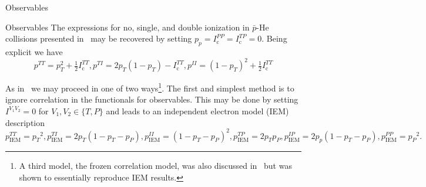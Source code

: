 \documentclass[letterpaper, 11 pt]{report}
\begin{document}
\begin{chapter}{Observables \label{chap:p-he2p-he}}
\begin{section}{Observables \label{sec:phe2p-obs}}
      The expressions for no, single, and double ionization in $\bar{p}$-He collisions presented
      in~\cite{pbarhe} may be recovered by setting $p_p = I^{PP}_\mathrm{c} = I^{TP}_\mathrm{c} = 0$.
      Being explicit we have
      \begin{subequations} \label{eq:prob-pbarhe}
         \begin{equation} \label{eq:ptt-pbarhe}
            p^{TT} = p_T^2 + \tfrac{1}{2} I^{TT}_\mathrm{c},
         \end{equation}
         \begin{equation} \label{eq:pti-pbarhe}
            p^{TI} = 2p_T(1 - p_T) - I^{TT}_\mathrm{c},
         \end{equation}
         \begin{equation} \label{eq:pii-pbarhe}
            p^{II} = (1 - p_T)^2 + \tfrac{1}{2} I^{TT}_\mathrm{c}
         \end{equation}
      \end{subequations}

      As in~\cite{pbarhe} we may proceed in one of two ways\footnote{A third model, the frozen
      correlation model, was also discussed in~\cite{pbarhe} but was shown to essentially reproduce IEM
      results.}. The first and simplest method is to ignore correlation in the functionals for
      observables. This may be done by setting $I^{V_1 V_2} = 0$ for $V_1,V_2 \in \{T,P\}$ and leads to
      an independent electron model (IEM) description
      \begin{subequations} \label{eq:prob-iem}
         \begin{equation} \label{eq:ptt-iem}
            p^{TT}_\mathrm{IEM} = {p_T}^2,
         \end{equation}
         \begin{equation} \label{eq:pti-iem}
            p^{TI}_\mathrm{IEM} = 2p_T(1 - p_T - p_P),
         \end{equation}
         \begin{equation} \label{eq:pii-iem}
            p^{II}_\mathrm{IEM} = (1 - p_T - p_P)^2,
         \end{equation}
         \begin{equation} \label{eq:ptp-iem}
            p^{TP}_\mathrm{IEM} = 2 p_T p_P,
         \end{equation}
         \begin{equation} \label{eq:pip-iem}
            p^{IP}_\mathrm{IEM} = 2 p_p (1 - p_T - p_P),
         \end{equation}
         \begin{equation} \label{eq:ppp-iem}
            p^{PP}_\mathrm{IEM} = {p_P}^2.
         \end{equation}
      \end{subequations}


\end{section}
\end{chapter}
\end{document}
